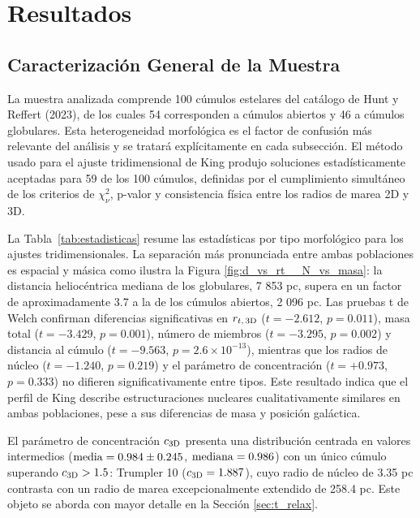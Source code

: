 
\chapter{Resultados}
\label{cap:resultados}

    \section{Caracterización General de la Muestra}

        La muestra analizada comprende 100 cúmulos estelares del catálogo de 
        Hunt y Reffert (2023), de los cuales 54 corresponden a cúmulos abiertos 
        y 46 a cúmulos globulares. Esta heterogeneidad morfológica es el factor 
        de confusión más relevante del análisis y se tratará explícitamente en 
        cada subsección. El método usado para el ajuste tridimensional de King 
        produjo soluciones estadísticamente aceptadas para 59 de los 100 
        cúmulos, definidas por el cumplimiento simultáneo de los criterios de 
        $\chi^2_\nu$, p-valor y consistencia física entre los radios de marea 2D 
        y 3D.

        La Tabla~\ref{tab:estadisticas} resume las estadísticas por tipo 
        morfológico para los ajustes tridimensionales. La separación más 
        pronunciada entre ambas poblaciones es espacial y másica como ilustra la 
        Figura \ref{fig:d_vs_rt__N_vs_masa}: la distancia heliocéntrica mediana 
        de los globulares, 7 853 pc, supera en un factor de aproximadamente 3.7 
        a la de los cúmulos abiertos, 2 096 pc. Las pruebas t de Welch confirman 
        diferencias significativas en $r_{t,\, 3{\rm D}}$ ($t = -2.612$, 
        $p = 0.011$), masa total ($t = -3.429$, $p = 0.001$), número de miembros 
        ($t = -3.295$, $p = 0.002$) y distancia al cúmulo ($t = -9.563$, 
        $p = 2.6 \times 10^{-13}$), mientras que los radios de núcleo 
        ($t = -1.240$, $p = 0.219$) y el parámetro de concentración 
        ($t = +0.973$, $p = 0.333$) no difieren significativamente entre tipos. 
        Este resultado indica que el perfil de King describe estructuraciones 
        nucleares cualitativamente similares en ambas poblaciones, pese a sus 
        diferencias de masa y posición galáctica.

        El parámetro de concentración $c_{3{\rm D}}$ presenta una distribución 
        centrada en valores intermedios (${\rm media} = 0.984 \pm 0.245$, 
        ${\rm mediana} = 0.986$) con un único cúmulo superando $c_{3{\rm D}} > 
        1.5$: Trumpler 10 ($c_{3{\rm D}} = 1.887$), cuyo radio de núcleo de 3.35 
        pc contrasta con un radio de marea excepcionalmente extendido de 258.4 
        pc. Este objeto se aborda con mayor detalle en la Sección 
        \ref{sec:t_relax}.

